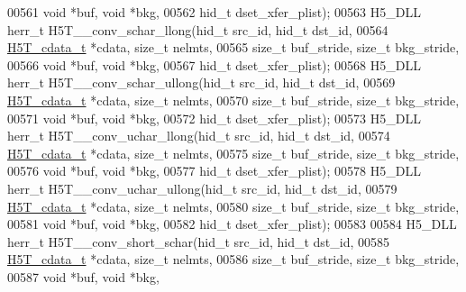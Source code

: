 \begin{DoxyCode}
00561                                     \textcolor{keywordtype}{void} *buf, \textcolor{keywordtype}{void} *bkg,
00562                                     hid\_t dset\_xfer\_plist);
00563 H5\_DLL herr\_t H5T\_\_conv\_schar\_llong(hid\_t src\_id, hid\_t dst\_id,
00564                     \hyperlink{struct_h5_t__cdata__t}{H5T\_cdata\_t} *cdata, \textcolor{keywordtype}{size\_t} nelmts,
00565                     \textcolor{keywordtype}{size\_t} buf\_stride, \textcolor{keywordtype}{size\_t} bkg\_stride,
00566                                     \textcolor{keywordtype}{void} *buf, \textcolor{keywordtype}{void} *bkg,
00567                                     hid\_t dset\_xfer\_plist);
00568 H5\_DLL herr\_t H5T\_\_conv\_schar\_ullong(hid\_t src\_id, hid\_t dst\_id,
00569                      \hyperlink{struct_h5_t__cdata__t}{H5T\_cdata\_t} *cdata, \textcolor{keywordtype}{size\_t} nelmts,
00570                      \textcolor{keywordtype}{size\_t} buf\_stride, \textcolor{keywordtype}{size\_t} bkg\_stride,
00571                                      \textcolor{keywordtype}{void} *buf, \textcolor{keywordtype}{void} *bkg,
00572                                      hid\_t dset\_xfer\_plist);
00573 H5\_DLL herr\_t H5T\_\_conv\_uchar\_llong(hid\_t src\_id, hid\_t dst\_id,
00574                     \hyperlink{struct_h5_t__cdata__t}{H5T\_cdata\_t} *cdata, \textcolor{keywordtype}{size\_t} nelmts,
00575                     \textcolor{keywordtype}{size\_t} buf\_stride, \textcolor{keywordtype}{size\_t} bkg\_stride,
00576                                     \textcolor{keywordtype}{void} *buf, \textcolor{keywordtype}{void} *bkg,
00577                                     hid\_t dset\_xfer\_plist);
00578 H5\_DLL herr\_t H5T\_\_conv\_uchar\_ullong(hid\_t src\_id, hid\_t dst\_id,
00579                      \hyperlink{struct_h5_t__cdata__t}{H5T\_cdata\_t} *cdata, \textcolor{keywordtype}{size\_t} nelmts,
00580                      \textcolor{keywordtype}{size\_t} buf\_stride, \textcolor{keywordtype}{size\_t} bkg\_stride,
00581                                      \textcolor{keywordtype}{void} *buf, \textcolor{keywordtype}{void} *bkg,
00582                                      hid\_t dset\_xfer\_plist);
00583 
00584 H5\_DLL herr\_t H5T\_\_conv\_short\_schar(hid\_t src\_id, hid\_t dst\_id,
00585                     \hyperlink{struct_h5_t__cdata__t}{H5T\_cdata\_t} *cdata, \textcolor{keywordtype}{size\_t} nelmts,
00586                     \textcolor{keywordtype}{size\_t} buf\_stride, \textcolor{keywordtype}{size\_t} bkg\_stride,
00587                                     \textcolor{keywordtype}{void} *buf, \textcolor{keywordtype}{void} *bkg,

\end{DoxyCode}
